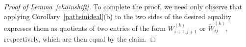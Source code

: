 \documentclass[ALCO,Unicode,published]{cedram}
\numberwithin{equation}{section}
\begin{document}
\begin{proof}[Proof of Lemma~\ref{chainshift}]
To complete the proof, we need only observe that applying Corollary~\ref{pathsinideal}(b) to the two sides of the desired equality expresses them as quotients of two entries of the form $W_{i+1,j+1}^{(k)}$ or $\widetilde W_{ij}^{(k)}$, respectively, which are then equal by the claim.
%
%
%
%
\end{proof}

\end{document}
